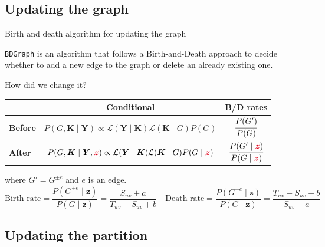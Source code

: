 \subsection{Updating the graph}
\begin{frame}{Birth and death algorithm for updating the graph}

    \texttt{BDGraph} is an algorithm that follows a Birth-and-Death approach to decide whether to \alert{add} a new edge to the graph or \alert{delete} an already existing one.

    How did we change it?

    \pause
    
    \begin{table}[tb]
        \centering
        \begin{tabular}{lcc}
        \toprule
        & Conditional & B/D rates \\ %
        \hline
        \textbf{Before} & $P(G,\bm{K} \mid \bm{Y}) \propto \mathcal{L}(\bm{Y} \mid \bm{K})\mathcal{L} (\bm{K} \mid {G})P(G)$ & $\cfrac{P(G')}{P(G)}$ \\
        \textbf{After}  & $P(G,\bm{K} \mid \bm{Y}, \textcolor{sleekRed}{\bm{z}}) \propto \mathcal{L}(\bm{Y} \mid \bm{K})\mathcal{L}(\bm{K} \mid {G})P(G \mid \textcolor{sleekRed}{\bm{z}})$ & $\cfrac{P(G' \mid \textcolor{sleekRed}{\bm{z}})}{P(G \mid \textcolor{sleekRed}{\bm{z}})}$ \\
        \bottomrule
        \end{tabular}
    \end{table}
    where $G' = G^{\pm e}$ and $e$ is an edge.
    \pause
    \[
        \text{Birth rate} = \frac{P(G^{+ e}\mid \bm{z})}{P(G\mid \bm{z})} = \frac{S_{uv} + a}{T_{uv} - S_{uv} + b}
        \quad
        \text{Death rate} =\frac{P(G^{- e}\mid \bm{z})}{P(G\mid \bm{z})} = \frac{T_{uv} - S_{uv} + b}{S_{uv} + a}
    \]
    
\end{frame}


\subsection{Updating the partition}


